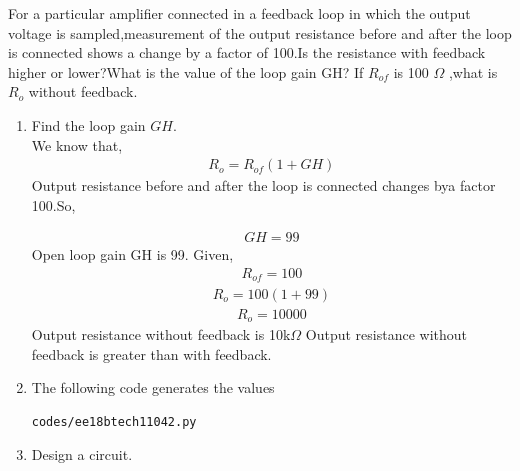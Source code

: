 For a particular amplifier connected in a feedback loop in which the output voltage is sampled,measurement of the output resistance before and after the loop is connected shows a change by a factor of 100.Is the resistance with feedback higher or lower?What is the value of the loop gain GH? If $R_{of}$ is 100 $\Omega$ ,what is $R_o$ without feedback.
\begin{enumerate}[label=\arabic*.,ref=\theenumi]


\item Find the loop gain $GH$.
\\
\solution
We know that,
\begin{align}
    R_o = R_{of}(1+GH)
    \label{eq:ee18btech11042_1}
\end{align}
Output resistance before and after the loop is connected changes bya factor 100.So,

\begin{align}
    GH =99
\end{align}
Open loop gain GH is  99.
\newline
Given,
\begin{align}
    R_{of} = 100 
    \label{eq:ee18btech11042_3}
\end{align}
\begin{align}
    R_o = 100(1+99)
    \label{eq:ee18btech11042_4}
\end{align}
\begin{align}
    R_o = 10000
    \label{eq:ee18btech11042_5}
\end{align}
Output resistance without feedback  is   10k$\Omega$
\newline
Output resistance without feedback is greater than with feedback.
\item
The following code generates the values
\begin{lstlisting}
codes/ee18btech11042.py
\end{lstlisting}

\item Design a circuit.
\solution



\end{enumerate}
